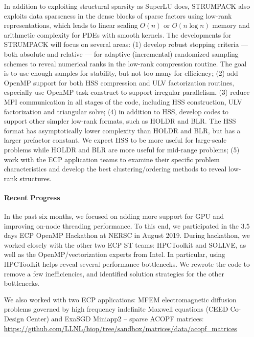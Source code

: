 In addition to exploiting structural sparsity as SuperLU does, STRUMPACK
also exploits data sparseness in the dense blocks of sparse factors using
low-rank representations, which leads to linear scaling $O(n)$ or $O(n \log n)$
memory and arithmetic complexity for PDEs with smooth kernels.
The developments for STRUMPACK will focus on several areas:
(1) develop robust stopping criteria --- both absolute and relative --- for
    adaptive (incremental) randomized sampling schemes to reveal numerical
    ranks in the low-rank compression routine. The goal is to use
    enough samples for stability, but not too many for efficiency;
(2) add OpenMP support for both HSS compression and ULV factorization routines,
    especially use OpenMP task construct to support irregular parallelism.
(3) reduce MPI communication in all stages of the code, including HSS
    construction, ULV factorization and triangular solve;
(4) in addition to HSS, develop codes to support other simpler low-rank
    formats, such as HOLDR and BLR. The HSS format has asymptotically
    lower complexity than HOLDR and BLR, but has a larger prefactor constant.
    We expect HSS to be more useful for large-scale problems while HOLDR
    and BLR are more useful for mid-range problems;
(5) work with the ECP application teams to examine their specific problem
    characteristics and develop the best clustering/ordering methods to 
    reveal low-rank structures.

\paragraph{Recent Progress}
In the past six months, we focused on adding more support for GPU and
improving on-node threading performance.  To this end, we participated
in the 3.5 days ECP OpenMP Hackathon at NERSC in August 2019. During hackathon,
we worked closely with the other two ECP ST teams: HPCToolkit and SOLLVE,
as well as the OpenMP/vectorization experts from Intel.  In particular,
using HPCToolkit helps reveal several performance bottlenecks.  We rewrote
the code to remove a few inefficiencies, and identified solution strategies
for the other bottlenecks.

We also worked with two ECP applications: MFEM electromagnetic diffusion
problems governed by high frequency indefinite Maxwell equations
(CEED Co-Design Center) and ExaSGD Miniapp2 -- sparse ACOPF matrices:
\url{https://github.com/LLNL/hiop/tree/sandbox/matrices/data/acopf_matrices}

